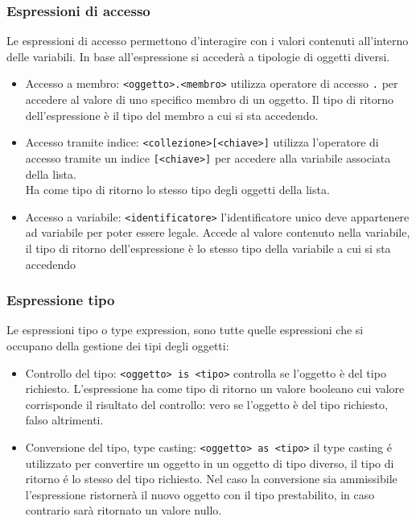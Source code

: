 \subsubsection{Espressioni di accesso}
Le espressioni di accesso permettono d'interagire con i valori contenuti all'interno delle variabili.
In base all'espressione si accederà a tipologie di oggetti diversi.

\begin{itemize}
    \item 
    {
        Accesso a membro: \lstinline|<oggetto>.<membro>| utilizza operatore di accesso \lstinline|.| per accedere
        al valore di uno specifico membro di un oggetto.
        Il tipo di ritorno dell'espressione è il tipo del membro a cui si sta accedendo.
    }
    \item 
    {
        Accesso tramite indice: \lstinline|<collezione>[<chiave>]| utilizza l'operatore di accesso tramite un indice
        \lstinline|[<chiave>]| per accedere alla variabile associata della lista. \\
        Ha come tipo di ritorno lo stesso tipo degli oggetti della lista.
    }
    \item 
    {
        Accesso a variabile: \lstinline|<identificatore>| l'identificatore unico deve appartenere ad variabile
        per poter essere legale. Accede al valore contenuto nella variabile, il tipo di ritorno dell'espressione
        è lo stesso tipo della variabile a cui si sta accedendo
    }
\end{itemize}

\subsubsection{Espressione tipo}
Le espressioni tipo o type expression, sono tutte quelle espressioni che si occupano della 
gestione dei tipi degli oggetti:
\begin{itemize}
    \item
    {
        Controllo del tipo: \lstinline|<oggetto> is <tipo>| controlla se l'oggetto è del tipo richiesto.
        L'espressione ha come tipo di ritorno un valore booleano cui valore corrisponde il risultato del controllo:
        vero se l'oggetto è del tipo richiesto, falso altrimenti.
    }
    \item 
    {
        Conversione del tipo, type casting: \lstinline|<oggetto> as <tipo>| il type casting é utilizzato
        per convertire un oggetto in un oggetto di tipo diverso, il tipo di ritorno é lo stesso del tipo richiesto.
        Nel caso la conversione sia ammissibile l'espressione ristornerà il nuovo oggetto con il tipo prestabilito,
        in caso contrario sarà ritornato un valore nullo.
    }
\end{itemize}

